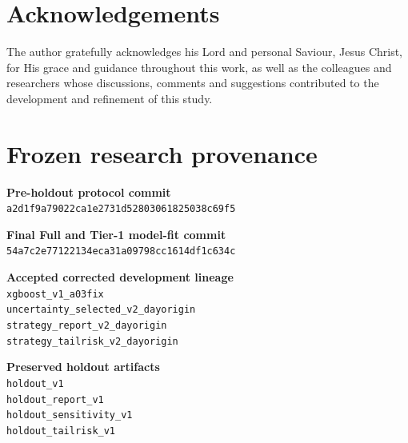 \documentclass[preprint,12pt,authoryear]{elsarticle}
\begin{document}
\section*{Acknowledgements}
The author gratefully acknowledges his Lord and personal Saviour, Jesus Christ, for His grace and guidance throughout this work, as well as the colleagues and researchers whose discussions, comments and suggestions contributed to the development and refinement of this study.




\appendix
\section{Frozen research provenance}
\label{app:provenance}

\begingroup
\small
\setlength{\parindent}{0pt}
\setlength{\parskip}{0.5em}

\textbf{Pre-holdout protocol commit}\\
\nolinkurl{a2d1f9a79022ca1e2731d52803061825038c69f5}

\textbf{Final Full and Tier-1 model-fit commit}\\
\nolinkurl{54a7c2e77122134eca31a09798cc1614df1c634c}

\textbf{Accepted corrected development lineage}\\
\nolinkurl{xgboost_v1_a03fix}\\
\nolinkurl{uncertainty_selected_v2_dayorigin}\\
\nolinkurl{strategy_report_v2_dayorigin}\\
\nolinkurl{strategy_tailrisk_v2_dayorigin}

\textbf{Preserved holdout artifacts}\\
\nolinkurl{holdout_v1}\\
\nolinkurl{holdout_report_v1}\\
\nolinkurl{holdout_sensitivity_v1}\\
\nolinkurl{holdout_tailrisk_v1}

\endgroup
\end{document}
